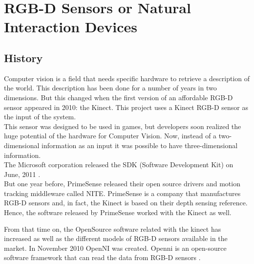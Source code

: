 



\section*{RGB-D Sensors or Natural Interaction Devices}

\subsection*{History}

Computer vision is a field that needs specific hardware to retrieve a description of the world. This description has been done for a number of years in two dimensions. But this changed when the first version of an affordable RGB-D sensor appeared in 2010: the Kinect. This project uses a Kinect RGB-D sensor as the input of the system.
\\

This sensor was designed to be used in games, but developers soon realized the huge potential of the hardware for Computer Vision.  
Now, instead of a two-dimensional information as an input it was possible to have three-dimensional information. 
\\

The Microsoft corporation released the SDK (Software Development Kit) on June, 2011 \cite{kinectSDK}.
\\

But one year before, PrimeSense released their open source drivers and motion tracking middleware called NITE\cite{NITE}. 
PrimeSense is a company that manufactures RGB-D sensors and, in fact, the Kinect is based on their depth sensing reference. Hence, the software released by PrimeSense worked with the Kinect as well. 

From that time on, the OpenSource software related with the kinect has increased as well as the different models of RGB-D sensors available in the market.
In November 2010 OpenNI was created. Openni is an open-source software framework that can read the data from RGB-D sensors \cite{openni}.  

